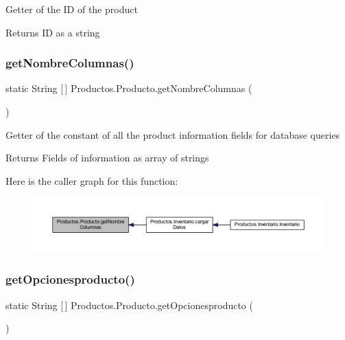 Getter of the ID of the product

\begin{DoxyReturn}{Returns}
ID as a string 
\end{DoxyReturn}
\mbox{\label{class_productos_1_1_producto_a2aa076fdb51668e1d75dd216a00ec909}} 
\subsubsection{\texorpdfstring{get\+Nombre\+Columnas()}{getNombreColumnas()}}
{\footnotesize\ttfamily static String \mbox{[}$\,$\mbox{]} Productos.\+Producto.\+get\+Nombre\+Columnas (\begin{DoxyParamCaption}{ }\end{DoxyParamCaption})\hspace{0.3cm}{\ttfamily [static]}}

Getter of the constant of all the product information fields for database queries

\begin{DoxyReturn}{Returns}
Fields of information as array of strings 
\end{DoxyReturn}
Here is the caller graph for this function\+:
\nopagebreak
\begin{figure}[H]
\begin{center}
\leavevmode
\includegraphics[width=350pt]{class_productos_1_1_producto_a2aa076fdb51668e1d75dd216a00ec909_icgraph}
\end{center}
\end{figure}
\mbox{\label{class_productos_1_1_producto_ac432aecde9919dbdd6df6002292c3c6d}} 
\subsubsection{\texorpdfstring{get\+Opcionesproducto()}{getOpcionesproducto()}}
{\footnotesize\ttfamily static String \mbox{[}$\,$\mbox{]} Productos.\+Producto.\+get\+Opcionesproducto (\begin{DoxyParamCaption}{ }\end{DoxyParamCaption})\hspace{0.3cm}{\ttfamily [static]}}

